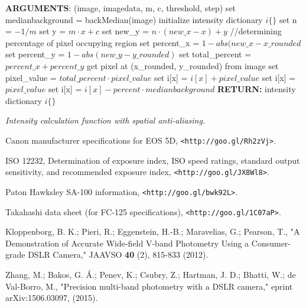 \documentclass[prb,preprint]{revtex4-1}
\begin{document}
\begin{algorithm}[!h]
	\begin{algorithmic}
		\STATE \textbf{ARGUMENTS}: (image, imagedata, m, c, threshold, step)
		\STATE set medianbackground = backMedian(image)
		\STATE initialize intensity dictionary $i\{\}$
		\STATE set n = $-1 / m$\;
		\STATE set y = $m \cdot x + c $
		\STATE set new\_y = $n \cdot (new\_x - x) + y $
		\STATE //determining percentage of pixel occupying region
		\STATE set percent\_x = $1 - abs(new\_x - x\_rounded$
		\STATE set percent\_y = $1 - abs(new\_y - y\_rounded)$
		\STATE set total\_percent = $percent\_x + percent\_y$
		\STATE get pixel at (x\_rounded, y\_rounded) from 	image
		\STATE set pixel\_value = $total\_percent \cdot pixel\_value$
		\STATE set i[x] = $i[x] + pixel\_value$
		\ELSE
		\STATE set i[x] = $pixel\_value$
		\ENDIF
		\STATE set i[x] = $i[x] - percent \cdot median background$
		\ENDIF
		\ENDFOR
		\ENDFOR
		\ENDIF
		\ENDFOR
		\ENDFOR
		\STATE \textbf{RETURN:} intensity dictionary $i\{\}$
	\end{algorithmic}
	\caption{\emph{Intensity calculation function with spatial anti-aliasing.}}\label{alg:1}
\end{algorithm}

\begin{thebibliography}{99}

	 Canon manufacturer specifications for EOS 5D, \verb|<http://goo.gl/Rh2zVj>|.

	 ISO 12232, Determination of exposure index, ISO speed ratings, standard output sensitivity, and recommended exposure index, \verb|<http://goo.gl/JX8Wl8>|.

	 Paton Hawksley SA-100 information, \verb|<http://goo.gl/bwk92L>|.

	 Takahashi data sheet (for FC-125 specifications), \verb|<http://goo.gl/1C07aP>|.

	 Kloppenborg, B. K.; Pieri, R.; Eggenstein, H.-B.; Maravelias, G.; Pearson, T., "A Demonstration of Accurate Wide-field V-band Photometry Using a Consumer-grade DSLR Camera," JAAVSO \textbf{40} (2), 815-833 (2012).

	 Zhang, M.; Bakos, G. Á.; Penev, K.; Csubry, Z.; Hartman, J. D.; Bhatti, W.; de Val-Borro, M., "Precision multi-band photometry with a DSLR camera," eprint arXiv:1506.03097, (2015).

\end{thebibliography}
\end{document}
